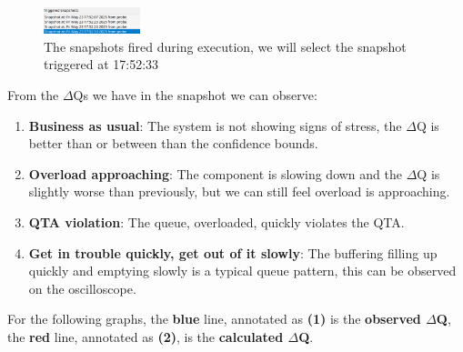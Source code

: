         \begin{figure}
            \caption{The snapshots fired during execution, we will select the snapshot triggered at 17:52:33}\label{wrap-fig:1}
            \includegraphics[width=0.25\textwidth]{img/snapshots.png}
        \end{figure} 

        From the $\Delta$Qs we have in the snapshot we can observe:
        \begin{enumerate}
            \item \textbf{Business as usual}: The system is not showing signs of stress, the $\Delta$Q is better than or between than the confidence bounds.
            \item \textbf{Overload approaching}: The component is slowing down and the $\Delta$Q is  slightly worse than previously, but we can still feel overload is approaching.
            \item \textbf{QTA violation}: The queue, overloaded, quickly violates the QTA.
            \item \textbf{Get in trouble quickly, get out of it slowly}: The buffering filling up quickly and emptying slowly is a typical queue pattern, this can be observed on the oscilloscope.
        \end{enumerate}
        
        For the following graphs, the \textbf{blue} line, annotated as \textbf{(1)} is the \textbf{observed $\Delta$Q}, the \textbf{red} line, annotated as \textbf{(2)}, is the \textbf{calculated $\Delta$Q}. 
